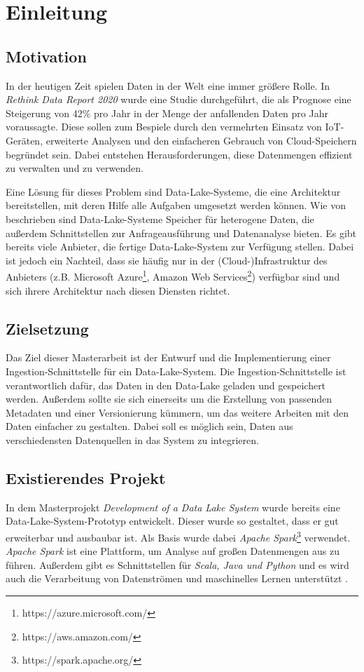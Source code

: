 \chapter{Einleitung}

\section{Motivation}
In der heutigen Zeit spielen Daten in der Welt eine immer größere Rolle.
In \textit{Rethink Data Report 2020} \textcite{rethink_data_2020} wurde eine Studie durchgeführt, die als Prognose eine Steigerung von 42\% pro Jahr in der Menge der anfallenden Daten pro Jahr voraussagte.
Diese sollen zum Bespiele durch den vermehrten Einsatz von IoT-Geräten, erweiterte Analysen und den einfacheren Gebrauch von Cloud-Speichern begründet sein.
Dabei entstehen Herausforderungen, diese Datenmengen effizient zu verwalten und zu verwenden.

Eine Lösung für dieses Problem sind Data-Lake-Systeme, die eine Architektur bereitstellen, mit deren Hilfe alle Aufgaben umgesetzt werden können.
Wie von \textcite{DBLP:journals/corr/abs-2106-09592} beschrieben sind Data-Lake-Systeme Speicher für heterogene Daten, die außerdem Schnittstellen zur Anfrageausführung und Datenanalyse bieten.
Es gibt bereits viele Anbieter, die fertige Data-Lake-System zur Verfügung stellen.
Dabei ist jedoch ein Nachteil, dass sie häufig nur in der (Cloud-)Infrastruktur des Anbieters (z.B. Microsoft Azure\footnote{https://azure.microsoft.com/}, Amazon Web Services\footnote{https://aws.amazon.com/}) verfügbar sind und sich ihrere Architektur nach diesen Diensten richtet.

\section{Zielsetzung}
Das Ziel dieser Masterarbeit ist der Entwurf und die Implementierung einer Ingestion-Schnittstelle für ein Data-Lake-System.
Die Ingestion-Schnittstelle ist verantwortlich dafür, das Daten in den Data-Lake geladen und gespeichert werden.
Außerdem sollte sie sich einerseits um die Erstellung von passenden Metadaten und einer Versionierung kümmern, um das weitere Arbeiten mit den Daten einfacher zu gestalten.
Dabei soll es möglich sein, Daten aus verschiedensten Datenquellen in das System zu integrieren.

\section{Existierendes Projekt}
In dem Masterprojekt \textit{Development of a Data Lake System} \parencite{datalake_proj} wurde bereits eine Data-Lake-System-Prototyp entwickelt.
Dieser wurde so gestaltet, dass er gut erweiterbar und ausbaubar ist.
Als Basis wurde dabei \textit{Apache Spark}\footnote{https://spark.apache.org/} verwendet.
\textit{Apache Spark} ist eine Plattform, um Analyse auf großen Datenmengen aus zu führen.
Außerdem gibt es Schnittstellen für \textit{Scala, Java und Python} und es wird auch die Verarbeitung von Datenströmen und maschinelles Lernen unterstützt \parencite{spark}.

